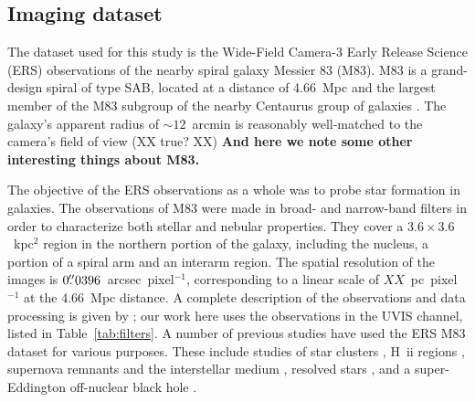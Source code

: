 
\subsection{Imaging dataset}
The dataset used for this study is the Wide-Field Camera-3
Early Release Science (ERS) observations of the nearby spiral galaxy Messier 83 (M83).
M83 is a grand-design spiral of type SAB, located at a distance of 4.66~Mpc \citep{tully13}
and the largest member of the M83 subgroup of the nearby Centaurus group of galaxies \citep{tully15}.
The galaxy's apparent radius of $\sim12$~arcmin \citep{} is reasonably well-matched to the camera's field of view (XX true? XX)
{\bf And here we note some other interesting things about M83.}

The objective of the ERS observations as a whole was to probe star formation in galaxies.
The observations of M83 were made in broad- and narrow-band filters in order to characterize both stellar and nebular properties.
They cover a $3.6\times3.6$~kpc$^2$ region in the northern portion of the galaxy, including the nucleus,
a portion of a spiral arm and an interarm region.
The spatial resolution of the images is $0\hbox{$.\!\!^{\prime\prime}$}0396$~arcsec~pixel$^{-1}$,
corresponding to a linear scale of $XX$~pc~pixel$^{-1}$ at the 4.66~Mpc distance.
A complete description of the observations and data processing is given by \citet{chandar10};
our work here uses the observations in the UVIS channel, listed in Table~\ref{tab:filters}.
A number of previous studies have used the ERS M83 dataset for various purposes.
These include studies of 
star clusters \citep{chandar10, wofford11, whitmore11, bastian11, bastian12, fouesneau12, silva13, andrews14, chandar14, adamo15,ryon15,hollyhead15, sun16},
H~{\sc ii} regions \citep{liu13}, supernova remnants and the interstellar medium \citep{dopita10, hong11, blair14, blair15}, 
resolved stars \citep{kim12, williams15},
and a super-Eddington off-nuclear black hole \citep{soria14}.


